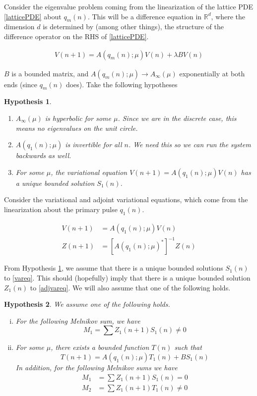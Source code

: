 \documentclass[12pt]{article}
\def\R{{\mathbb R}}
\newtheorem{hypothesis}{Hypothesis}
\begin{document}
Consider the eigenvalue problem coming from the linearization of the lattice PDE \eqref{latticePDE} about $q_m(n)$. This will be a difference equation in $\R^d$, where the dimension $d$ is determined by (among other things), the structure of the difference operator on the RHS of \eqref{latticePDE}.

\begin{align*}
V(n+1) = A(q_m(n); \mu) V(n) + \lambda B V(n)
\end{align*}

$B$ is a bounded matrix, and $A(q_m(n); \mu) \rightarrow A_\infty(\mu)$ exponentially at both ends (since $q_m(n)$ does). Take the following hypotheses

\begin{hypothesis}\label{initialhyp}
\[\]
\begin{enumerate}
	\item $A_\infty(\mu)$ is hyperbolic for some $\mu$. Since we are in the discrete case, this means no eigenvalues on the unit circle.
	\item $A(q_1(n); \mu)$ is invertible for all $n$. We need this so we can run the system backwards as well.
	\item For some $\mu$, the variational equation $V(n+1) = A(q_1(n); \mu) V(n)$ has a unique bounded solution $S_1(n)$.
\end{enumerate}
\end{hypothesis}

Consider the variational and adjoint variational equations, which come from the linearization about the primary pulse $q_1(n)$.

\begin{align}
V(n+1) &= A(q_1(n); \mu) V(n) \label{vareq} \\
Z(n+1) &= [A(q_1(n); \mu)^*]^{-1} Z(n) \label{adjvareq}
\end{align}

From Hypothesis \ref{initialhyp}, we assume that there is a unique bounded solutions $S_1(n)$ to \eqref{vareq}. This should (hopefully) imply that there is a unique bounded solution $Z_1(n)$ to \eqref{adjvareq}. We will also assume that one of the following holds.

\begin{hypothesis}\label{melnikovhyp}
We assume one of the following holds.
\begin{enumerate}[(i)]
\item For the following Melnikov sum, we have
\[
M_1 = \sum Z_1(n+1) S_1(n) \neq 0
\]
\item For some $\mu$, there exists a bounded function $T(n)$ such that 
\[
T(n+1) = A(q_1(n); \mu) T_1(n) + B S_1(n)
\]
In addition, for the following Melnikov sums we have
\begin{align*}
M_1 &= \sum Z_1(n+1) S_1(n) = 0 \\
M_2 &= \sum Z_1(n+1) T_1(n) \neq 0 
\end{align*}
\end{enumerate}
\end{hypothesis}
\end{document}
